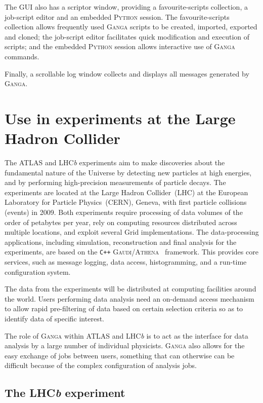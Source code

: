 \documentclass{elsart}
\def\lhcb {LHC{\em b\/}\xspace}
\def\atlas {ATLAS\xspace}
\def\lhc {LHC\xspace}
\def\ganga {\textsc{Ganga}\xspace}
\def\python {\textsc{Python}\xspace}
\def\gaudi {\textsc{Gaudi}\xspace}
\def\athena {\textsc{Athena}\xspace}
\def\grid {Grid\xspace}
\newcommand{\code}[1]{\texttt{#1}}
\begin{document}
The GUI also has a scriptor window, providing a
favourite-scripts collection, a job-script editor and an embedded \python
session.  The favourite-scripts collection allows frequently used \ganga
scripts to be created, imported, exported and cloned; the job-script editor
facilitates quick modification and execution of scripts; and the
embedded \python session allows interactive use of \ganga commands.

Finally, a scrollable log window collects and displays all messages  
generated by \ganga.


\section{Use in experiments at the Large Hadron Collider}
\label{sec:useHEP}

The \atlas and \lhcb experiments aim to make discoveries about the
fundamental nature of the Universe by detecting new particles at 
high energies, and by performing high-precision measurements of
particle decays. The experiments
are located at the Large Hadron Collider~(\lhc) at the European Laboratory for
Particle Physics~(CERN), Geneva, with first particle collisions (events) in
2009. Both experiments require processing of data
volumes of the order of petabytes per year, rely on computing resources
distributed across multiple locations, and exploit several \grid implementations. The data-processing applications,
including simulation, reconstruction and final analysis for the experiments,
are based on the \code{C++} \gaudi/\athena~\cite{gaudi} framework.  This
provides core services, such as message logging, data access, histogramming,
and a run-time configuration system. 

The data from the experiments will be distributed at computing facilities
around the world. Users performing data analysis need an on-demand access
mechanism to allow rapid pre-filtering of data based on certain selection
criteria so as to identify data of specific interest.

The role of \ganga within \atlas and \lhcb is to act as the interface for data
analysis by a large number of individual physicists. \ganga also allows for
the easy exchange of jobs between users, something that can otherwise can be difficult
because of the complex configuration of analysis jobs.

\subsection{The \lhcb experiment}
\label{sec:lhcb}
\end{document}
